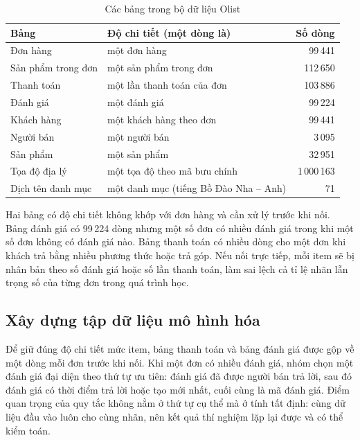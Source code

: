 \documentclass[12pt,a4paper]{report}
\begin{document}
\begin{table}[htbp]\centering\small
\caption{Các bảng trong bộ dữ liệu Olist}\label{tab:olist}
\begin{tabular}{llr}
\toprule
Bảng & Độ chi tiết (một dòng là) & Số dòng \\
\midrule
Đơn hàng                 & một đơn hàng                          &    99\,441 \\
Sản phẩm trong đơn       & một sản phẩm trong đơn                &   112\,650 \\
Thanh toán               & một lần thanh toán của đơn            &   103\,886 \\
Đánh giá                 & một đánh giá                          &    99\,224 \\
Khách hàng               & một khách hàng theo đơn               &    99\,441 \\
Người bán                & một người bán                         &     3\,095 \\
Sản phẩm                 & một sản phẩm                          &    32\,951 \\
Tọa độ địa lý            & một tọa độ theo mã bưu chính          & 1\,000\,163 \\
Dịch tên danh mục        & một danh mục (tiếng Bồ Đào Nha -- Anh) & 71 \\
\bottomrule
\end{tabular}
\end{table}

Hai bảng có độ chi tiết không khớp với đơn hàng và cần xử lý trước khi nối. Bảng đánh giá có 99\,224 dòng nhưng một số đơn có nhiều đánh giá trong khi một số đơn không có đánh giá nào. Bảng thanh toán có nhiều dòng cho một đơn khi khách trả bằng nhiều phương thức hoặc trả góp. Nếu nối trực tiếp, mỗi item sẽ bị nhân bản theo số đánh giá hoặc số lần thanh toán, làm sai lệch cả tỉ lệ nhãn lẫn trọng số của từng đơn trong quá trình học.

\subsection{Xây dựng tập dữ liệu mô hình hóa}

Để giữ đúng độ chi tiết mức item, bảng thanh toán và bảng đánh giá được gộp về một dòng mỗi đơn trước khi nối. Khi một đơn có nhiều đánh giá, nhóm chọn một đánh giá đại diện theo thứ tự ưu tiên: đánh giá đã được người bán trả lời, sau đó đánh giá có thời điểm trả lời hoặc tạo mới nhất, cuối cùng là mã đánh giá. Điểm quan trọng của quy tắc không nằm ở thứ tự cụ thể mà ở tính tất định: cùng dữ liệu đầu vào luôn cho cùng nhãn, nên kết quả thí nghiệm lặp lại được và có thể kiểm toán.
\end{document}
